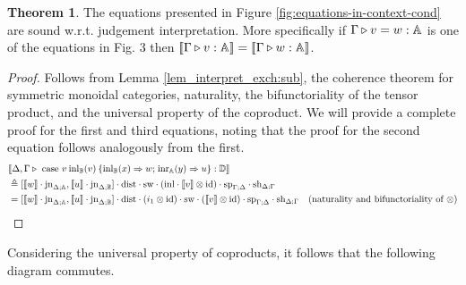 \documentclass[10pt,a4paper]{amsart}
\theoremstyle{definition}
\theoremstyle{definition}
\theoremstyle{definition}
\theoremstyle{definition}
\theoremstyle{definition}
\theoremstyle{definition}
\newtheorem{theorem}[definition]{Theorem}
\begin{document}
\begin{theorem} \label {theorem:eq_in_context}
  The equations presented in Figure \ref{fig:equations-in-context-cond} are sound w.r.t. judgement interpretation. More specifically if $ \Gamma \triangleright v = w: \mathbb{A}$ is one of the equations in Fig. 3 then $[\![ \Gamma \triangleright v: \mathbb{A} ]\!] = [\![ \Gamma \triangleright w: \mathbb{A} ]\!]$.
\end{theorem}

\begin{proof}
  Follows from Lemma \autoref{lem_interpret_exch:sub}, the coherence theorem for symmetric monoidal categories, naturality,  the bifunctoriality of the tensor product, and the universal property of the coproduct.   
  We will provide a complete proof for the first and third equations, noting that the proof for the second equation follows analogously from the first.
  \begin{align*}
    &\llbracket \Delta,\Gamma \triangleright  \text{ case } v \hspace{2pt} \text{inl}_{\mathbb{B}}(v) \hspace{2pt} \{\text{inl}_{\mathbb{B}} (x) \Rightarrow w ; \hspace{1pt} \text{inr}_{\mathbb{A}} (y) \Rightarrow u\}: \mathbb{D}\rrbracket \\
    & \triangleq  [\llbracket w\rrbracket \cdot \text{jn}_{\Delta;\mathbb{A}},\llbracket u \rrbracket\cdot \text{jn}_{\Delta;\mathbb{B}}] \cdot \text{dist} \cdot \text{sw} \cdot (\mathrm{inl} \cdot \llbracket  v \rrbracket \otimes \text{id}) \cdot \text{sp}_{\Gamma;\Delta} \cdot \text{sh}_{\Delta;\Gamma} \\
    & = [\llbracket w\rrbracket \cdot \text{jn}_{\Delta;\mathbb{A}},\llbracket u \rrbracket\cdot \text{jn}_{\Delta;\mathbb{B}}] \cdot \text{dist} \cdot (i_1 \otimes \text{id}) \cdot \text{sw} \cdot ( \llbracket  v \rrbracket \otimes \text{id}) \cdot \text{sp}_{\Gamma;\Delta} \cdot \text{sh}_{\Delta;\Gamma} &{(\text{naturality and bifunctoriality  of } \otimes}) 
  \end{align*}
\end{proof}

Considering the universal property of coproducts, it follows that the following
diagram commutes.~

\end{document}
